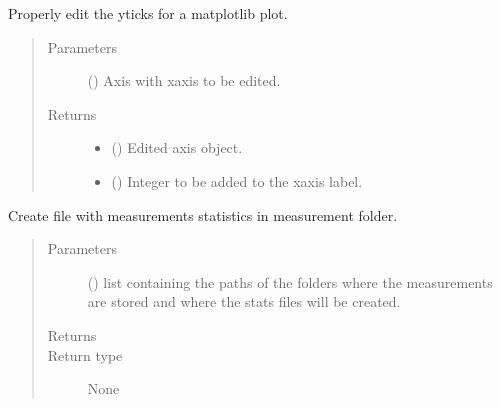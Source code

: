 \documentclass[letterpaper,10pt,english]{sphinxmanual}
\begin{document}
\begin{fulllineitems}
\label{\detokenize{tes:tes.traces.correct_yticks}}
\sphinxAtStartPar
Properly edit the yticks for a matplotlib plot.
\begin{quote}\begin{description}
\item[{Parameters}] \leavevmode
\sphinxAtStartPar
{} () \textendash{} Axis with x\sphinxhyphen{}axis to be edited.

\item[{Returns}] \leavevmode
\sphinxAtStartPar
\begin{itemize}
\item {} 
\sphinxAtStartPar
{} () \textendash{} Edited axis object.

\item {} 
\sphinxAtStartPar
{} () \textendash{} Integer to be added to the x\sphinxhyphen{}axis label.

\end{itemize}


\end{description}\end{quote}

\end{fulllineitems}


\begin{fulllineitems}
\label{\detokenize{tes:tes.traces.create_statistics_file}}
\sphinxAtStartPar
Create file with measurements statistics in measurement folder.
\begin{quote}\begin{description}
\item[{Parameters}] \leavevmode
\sphinxAtStartPar
{} () \textendash{} list containing the paths of the folders where the measurements
are stored and where the stats files will be created.

\item[{Returns}] \leavevmode
\sphinxAtStartPar


\item[{Return type}] \leavevmode
\sphinxAtStartPar
None

\end{description}\end{quote}

\end{fulllineitems}
\end{document}
